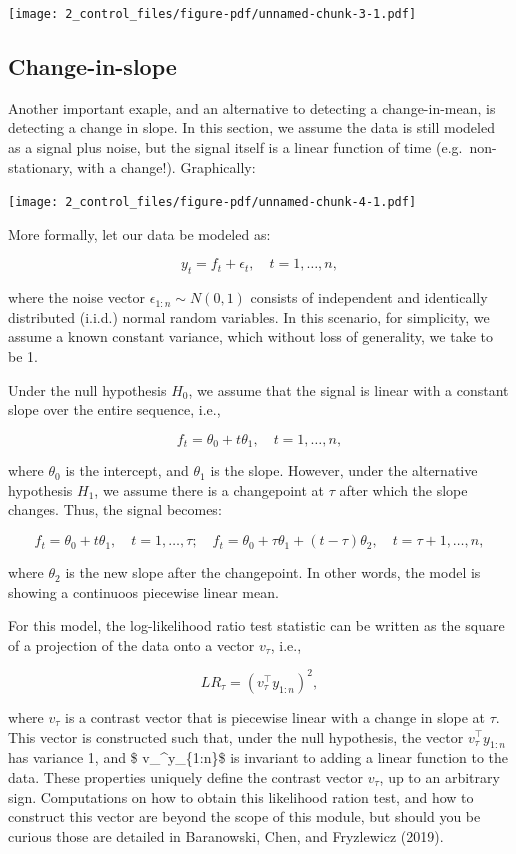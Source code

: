 \documentclass[
  letterpaper,
  DIV=11,
  numbers=noendperiod]{scrreprt}
\begin{document}
\texttt{[image: 2\_control\_files/figure-pdf/unnamed-chunk-3-1.pdf]}

\subsection{Change-in-slope}\label{change-in-slope}

Another important exaple, and an alternative to detecting a
change-in-mean, is detecting a change in slope. In this section, we
assume the data is still modeled as a signal plus noise, but the signal
itself is a linear function of time (e.g.~non-stationary, with a
change!). Graphically:

\texttt{[image: 2\_control\_files/figure-pdf/unnamed-chunk-4-1.pdf]}

More formally, let our data be modeled as:

\[
y_t = f_t + \epsilon_t, \quad t = 1, \dots, n,
\]

where the noise vector \(\epsilon_{1:n} \sim N(0, 1)\) consists of
independent and identically distributed (i.i.d.) normal random
variables. In this scenario, for simplicity, we assume a known constant
variance, which without loss of generality, we take to be 1.

Under the null hypothesis \(H_0\), we assume that the signal is linear
with a constant slope over the entire sequence, i.e.,

\[
f_t = \theta_0 + t\theta_1, \quad t = 1, \dots, n,
\]

where \(\theta_0\) is the intercept, and \(\theta_1\) is the slope.
However, under the alternative hypothesis \(H_1\), we assume there is a
changepoint at \(\tau\) after which the slope changes. Thus, the signal
becomes:

\[
f_t = \theta_0 + t\theta_1, \quad t = 1, \dots, \tau; \quad f_t = \theta_0 + \tau \theta_1 + (t-\tau)\theta_2, \quad t = \tau+1, \dots, n,
\]

where \(\theta_2\) is the new slope after the changepoint. In other
words, the model is showing a continuoos piecewise linear mean.

For this model, the log-likelihood ratio test statistic can be written
as the square of a projection of the data onto a vector \(v_\tau\),
i.e.,

\[
LR_\tau = \left( v_\tau^\top y_{1:n} \right)^2,
\]

where \(v_\tau\) is a contrast vector that is piecewise linear with a
change in slope at \(\tau\). This vector is constructed such that, under
the null hypothesis, the vector \(v_\tau^\top y_{1:n}\) has variance 1,
and \$ v\_\tau\^{}\top y\_\{1:n\}\$ is invariant to adding a linear
function to the data. These properties uniquely define the contrast
vector \(v_\tau\), up to an arbitrary sign. Computations on how to
obtain this likelihood ration test, and how to construct this vector are
beyond the scope of this module, but should you be curious those are
detailed in Baranowski, Chen, and Fryzlewicz (2019).
\end{document}
